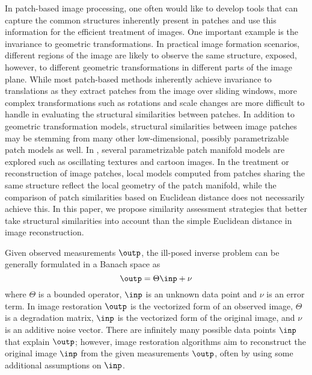 \documentclass[journal]{IEEEtran}
\begin{document}
In patch-based image processing, one often would like to develop tools that can capture the common structures inherently present in patches and use this information for the efficient treatment of images. One important example is the invariance to geometric transformations. In practical image formation scenarios, different regions of the image are likely to observe the same structure, exposed, however, to different geometric transformations in different parts of the image plane. While most patch-based methods inherently achieve invariance to translations as they extract patches from the image over sliding windows, more complex transformations such as rotations and scale changes are more difficult to handle in evaluating the structural similarities between patches. In addition to geometric transformation models, structural similarities between image patches may be stemming from many other low-dimensional, possibly parametrizable patch models as well. In \cite{Peyre09manifold}, several parametrizable patch manifold models are explored such as oscillating textures and cartoon images. In the treatment or reconstruction of image patches, local models computed from patches sharing the same structure reflect the local geometry of the patch manifold, while the comparison of patch similarities based on Euclidean distance does not necessarily achieve this. In this paper, we propose similarity assessment strategies that better take  structural similarities into account than the simple Euclidean distance in image reconstruction.

Given observed measurements $\outp$, the ill-posed inverse problem can be generally formulated in a Banach space as
%
\begin{equation}
	\label{eqn:inverse}
	\outp = \Theta \inp+\nu
\end{equation}
%
where $\Theta$ is a bounded operator, $\inp$ is an unknown data point and $\nu$ is an error term.  In image restoration $\outp$ is the vectorized form of an observed image, $\Theta$ is a degradation matrix, $\inp$ is the vectorized form of the original image, and $\nu$ is an additive noise vector. There are infinitely many possible data points $\inp$ that explain $\outp$; however, image restoration algorithms aim to reconstruct the original image $\inp$ from the given measurements $\outp$, often by using some additional assumptions on $\inp$. 
%
\end{document}

